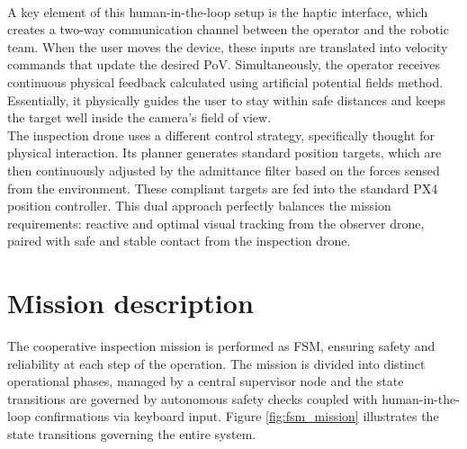 \\A key element of this human-in-the-loop setup is the haptic interface, which creates a two-way communication channel between the operator and the robotic team. When the user moves the device, these inputs are translated into velocity commands that update the desired PoV. Simultaneously, the operator receives continuous physical feedback calculated using artificial potential fields method. Essentially, it physically guides the user to stay within safe distances and keeps the target well inside the camera's field of view.
\\The inspection drone uses a different control strategy, specifically thought for physical interaction. Its planner generates standard position targets, which are then continuously adjusted by the admittance filter based on the forces sensed from the environment. These compliant targets are fed into the standard PX4 position controller. This dual approach perfectly balances the mission requirements: reactive and optimal visual tracking from the observer drone, paired with safe and stable contact from the inspection drone.


\section{Mission description}
The cooperative inspection mission is performed as FSM, ensuring safety and reliability at each step of the operation. The mission is divided into distinct operational phases, managed by a central supervisor node and the state transitions are governed by autonomous safety checks coupled with human-in-the-loop confirmations via keyboard input. Figure \ref{fig:fsm_mission} illustrates the state transitions governing the entire system.

